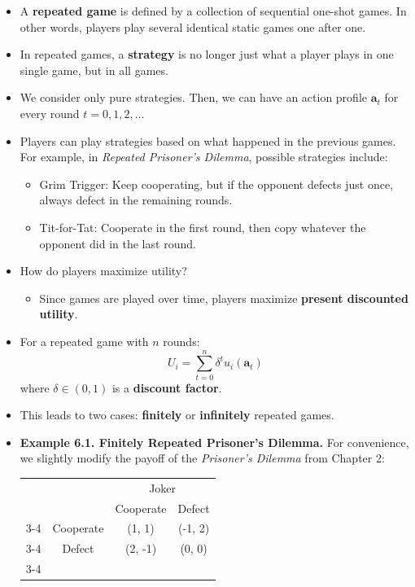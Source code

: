 \documentclass[notitlepage]{article}
\begin{document}
\begin{itemize}
    \item A \textbf{repeated game} is defined by a collection of sequential one-shot games. In other words, players play several identical static games one after one.
    \item In repeated games, a \textbf{strategy} is no longer just what a player plays in one single game, but in all games.
    \item We consider only pure strategies. Then, we can have an action profile \(\mathbf{a}_t\) for every round \(t = 0,1,2,\dots\)
    \item Players can play strategies based on what happened in the previous games. For example, in \textit{Repeated Prisoner's Dilemma}, possible strategies include:
    \begin{itemize}
        \item Grim Trigger: Keep cooperating, but if the opponent defects just once, always defect in the remaining rounds.
        \item Tit-for-Tat: Cooperate in the first round, then copy whatever the opponent did in the last round.
    \end{itemize}
    \item How do players maximize utility?
    \begin{itemize}
        \item Since games are played over time, players maximize \textbf{present discounted utility}.
    \end{itemize}
    \item For a repeated game with \(n\) rounds:
    \[
    U_i = \sum_{t=0}^n \delta^t u_i(\mathbf{a}_t)
    \]
    where \(\delta \in (0,1)\) is a \textbf{discount factor}.
    \item This leads to two cases: \textbf{finitely} or \textbf{infinitely} repeated games.
    \item \textbf{Example 6.1. Finitely Repeated Prisoner's Dilemma.} For convenience, we slightly modify the payoff of the \textit{Prisoner's Dilemma} from Chapter 2:

\begin{table}[h]
\begin{center}
\begin{tabular}{llcc}
&&
\multicolumn{2}{c}{Joker}  \\&& 
{Cooperate} & 
{Defect} 
\\ \cline{3-4} 
\multirow{2}{*}{Bane} & 
\multicolumn{1}{c|}{Cooperate} & 
\multicolumn{1}{c|}{(1, 1)} &
\multicolumn{1}{c|}{(-1, 2)} 
\\ \cline{3-4} & 
\multicolumn{1}{c|}{Defect} & 
\multicolumn{1}{c|}{(2, -1)} &
\multicolumn{1}{c|}{(0, 0)} 
\\ \cline{3-4} 
\end{tabular}
\end{center}
\end{table}


\end{itemize}
\end{document}
